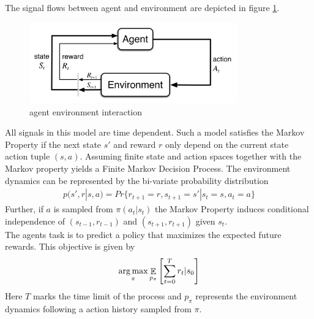 The signal flows between agent and environment are depicted in figure \ref{fig_rl_gen}.

\begin{figure}
	\centering
	\includegraphics[width=0.8\textwidth]{figures/rl/agent_env_interface}
	\caption{agent environment interaction \cite{SB_all}}
	\label{fig_rl_gen}
\end{figure}

All signals in this model are time dependent. 
Such a model satisfies the Markov Property if the next state $s'$ and reward $r$ only depend on the current state action tuple $(s, a)$. Assuming finite state and action spaces together with the Markov property yields a Finite Markov Decision Process. The environment dynamics can be represented by the bi-variate probability distribution
\begin{align}
	p(s', r|s, a) = Pr\{r_{t+1}=r, s_{t+1} = s' | s_t=s, a_t=a\}
\end{align}
Further, if $a$ is sampled from $\pi(a_t|s_t)$ the Markov Property induces conditional independence of $(s_{t-1}, r_{t-1})$ and $(s_{t+1}, r_{t+1})$ given $s_t$. \\

The agents task is to predict a policy that maximizes the expected future rewards. This objective is given by
\begin{align}
	\operatorname*{arg\,max}_{\pi}\mathop{\mathbb{E}}_{p_{\pi}}\left[\sum_{t=0}^T r_t | s_0\right]
\end{align}
Here $T$ marks the time limit of the process and $p_{\pi}$ represents the environment dynamics following a action history sampled from $\pi$.\\

